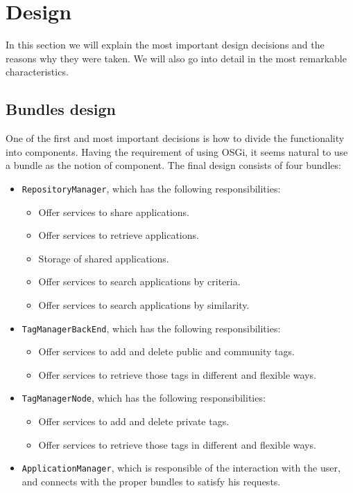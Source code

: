 
\section{Design}

In this section we will explain the most important design decisions and the
reasons why they were taken. We will also go into detail in the most
remarkable characteristics.


\subsection{Bundles design}
\label{subsec:bundles-design}
One of the first and most important decisions is how to divide the
functionality into components. Having the requirement of using OSGi, it seems
natural to use a bundle as the notion of component.
The final design consists of four bundles:

\begin{itemize}
	\item \verb|RepositoryManager|, which has the following responsibilities:
	  	\begin{itemize}
	        \item Offer services to share applications.
	        \item Offer services to retrieve applications.
	        \item Storage of shared applications.
	        \item Offer services to search applications by criteria.
	        \item Offer services to search applications by similarity.
          \end{itemize} 
          
	\item \verb|TagManagerBackEnd|, which has the following responsibilities:
	  	\begin{itemize}
	        \item Offer services to add and delete public and community tags.
	        \item Offer services to retrieve those tags in different and flexible
	        ways.
          \end{itemize} 
          
	\item \verb|TagManagerNode|, which has the following responsibilities:
	  	\begin{itemize}
	        \item Offer services to add and delete private tags.
	        \item Offer services to retrieve those tags in different and flexible
	        ways.
        \end{itemize} 
          
	\item \verb|ApplicationManager|, which is responsible of the interaction with
	the user, and connects with the proper bundles to satisfy his requests.
      
\end{itemize}

